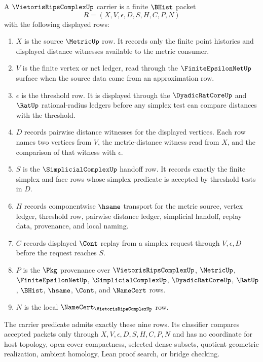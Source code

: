 \begin{definition}
\label{def:vietoris-rips-complex-carrier}
A $\VietorisRipsComplexUp$ carrier is a finite $\BHist$ packet
$$
R=(X,V,\epsilon,D,S,H,C,P,N)
$$
with the following displayed rows:
\begin{enumerate}
\item $X$ is the source $\MetricUp$ row. It records only the finite point histories and displayed distance witnesses available to the metric consumer.
\item $V$ is the finite vertex or net ledger, read through the $\FiniteEpsilonNetUp$ surface when the source data come from an approximation row.
\item $\epsilon$ is the threshold row. It is displayed through the $\DyadicRatCoreUp$ and $\RatUp$ rational-radius ledgers before any simplex test can compare distances with the threshold.
\item $D$ records pairwise distance witnesses for the displayed vertices. Each row names two vertices from $V$, the metric-distance witness read from $X$, and the comparison of that witness with $\epsilon$.
\item $S$ is the $\SimplicialComplexUp$ handoff row. It records exactly the finite simplex and face rows whose simplex predicate is accepted by threshold tests in $D$.
\item $H$ records componentwise $\hsame$ transport for the metric source, vertex ledger, threshold row, pairwise distance ledger, simplicial handoff, replay data, provenance, and local naming.
\item $C$ records displayed $\Cont$ replay from a simplex request through $V,\epsilon,D$ before the request reaches $S$.
\item $P$ is the $\Pkg$ provenance over $\VietorisRipsComplexUp$, $\MetricUp$, $\FiniteEpsilonNetUp$, $\SimplicialComplexUp$, $\DyadicRatCoreUp$, $\RatUp$, $\BHist$, $\hsame$, $\Cont$, and $\NameCert$ rows.
\item $N$ is the local $\NameCert_{\VietorisRipsComplexUp}$ row.
\end{enumerate}
The carrier predicate admits exactly these nine rows. Its classifier compares accepted packets only through $X,V,\epsilon,D,S,H,C,P,N$ and has no coordinate for host topology, open-cover compactness, selected dense subsets, quotient geometric realization, ambient homology, Lean proof search, or bridge checking.
\end{definition}

